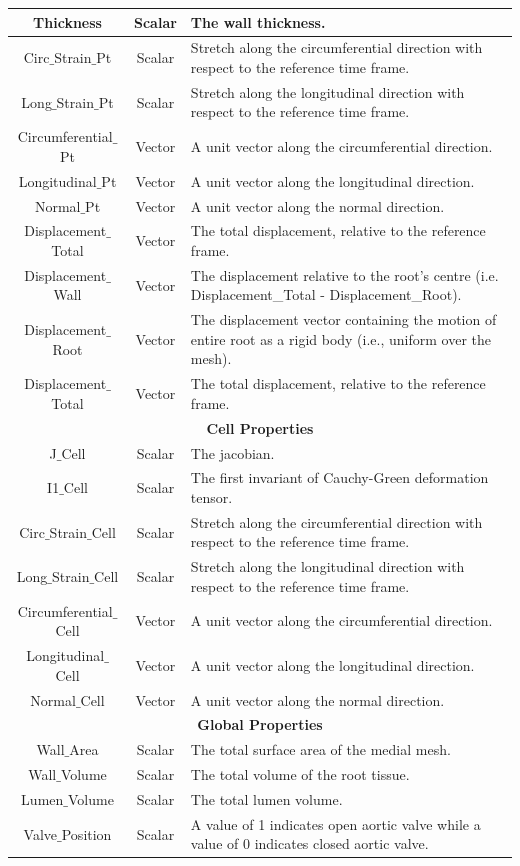 \documentclass{article}
\begin{document}
\begin{tabular}{|c|c|p{9.4cm}|}
\hline
Thickness	&Scalar & The wall thickness.\\
	\hline
Circ$\_$Strain$\_$Pt	& Scalar & Stretch along the circumferential direction with respect to the reference time frame.\\
\hline
Long$\_$Strain$\_$Pt	& Scalar & Stretch along the longitudinal direction with respect to the reference time frame.\\
	\hline
Circumferential$\_$Pt	& Vector & A unit vector along the circumferential direction. \\
	\hline
Longitudinal$\_$Pt	&Vector & A unit vector along the longitudinal direction.\\
	\hline
Normal$\_$Pt	&Vector & A unit vector along the normal direction.\\
\hline
Displacement$\_$Total & Vector & The total displacement, relative to the reference frame. \\
	\hline
Displacement$\_$Wall & Vector & The displacement relative to the root's centre \newline (i.e. Displacement\_Total - Displacement\_Root). \\
	\hline
Displacement$\_$Root  &  Vector& The displacement vector containing the motion of entire root as a rigid body (i.e., uniform over the mesh).\\
	\hline
Displacement$\_$Total & Vector & The total displacement, relative to the reference frame. \\
\hline
\hline
\multicolumn{3}{|c|}{\textbf{Cell Properties}} \\
\hline
J$\_$Cell	& Scalar& The jacobian.\\
\hline
I1$\_$Cell& Scalar & The first invariant of Cauchy-Green deformation tensor. \\
\hline
Circ$\_$Strain$\_$Cell & Scalar & Stretch along the circumferential direction with respect to the reference time frame.\\
\hline
Long$\_$Strain$\_$Cell & Scalar & Stretch along the longitudinal direction with respect to the reference time frame. \\
	\hline
Circumferential$\_$Cell	&  Vector  & A unit vector along the circumferential direction.\\
	\hline
Longitudinal$\_$Cell 	&  Vector & A unit vector along the longitudinal direction.\\
	\hline
Normal$\_$Cell 	&  Vector & A unit vector along the normal direction.\\
\hline
\hline
\multicolumn{3}{|c|}{\textbf{Global  Properties}} \\
\hline
Wall$\_$Area	&Scalar &The total surface area of the medial mesh. \\
	\hline
	Wall$\_$Volume	&Scalar &The total volume of the root tissue. \\
	\hline
	Lumen$\_$Volume	&Scalar &The total lumen volume. \\	
	\hline
Valve$\_$Position	&Scalar & A value of 1 indicates open aortic valve while a value of 0 indicates closed aortic valve.\\
	\hline
\end{tabular}
\end{document}
